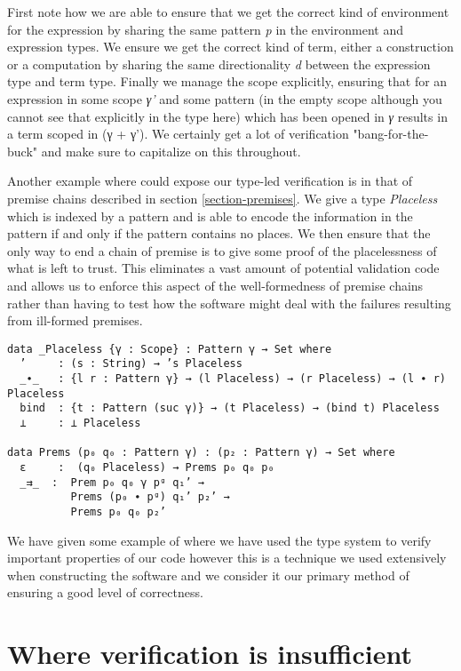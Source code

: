 First note how we are able to ensure that we get the correct kind of
environment for the expression by sharing the same pattern \emph{p} in
the environment and expression types. We ensure we get the correct
kind of term, either a construction or a computation by sharing the
same directionality \emph{d} between the expression type and term
type. Finally we manage the scope explicitly, ensuring that for an
expression in some scope \emph{γ'} and some pattern (in the empty
scope although you cannot see that explicitly in the type here) which
has been opened in \emph{γ} results in a term scoped in (γ + γ'). We
certainly get a lot of verification "bang-for-the-buck" and make sure
to capitalize on this throughout.

Another example where could expose our type-led verification is in
that of premise chains described in section \ref{section-premises}. We
give a type \emph{Placeless} which is indexed by a pattern and is able
to encode the information in the pattern if and only if the pattern
contains no places. We then ensure that the only way to end a chain of
premise is to give some proof of the placelessness of what is left to
trust. This eliminates a vast amount of potential validation code and
allows us to enforce this aspect of the well-formedness of premise
chains rather than having to test how the software might deal
with the failures resulting from ill-formed premises.

\begin{verbatim}
data _Placeless {γ : Scope} : Pattern γ → Set where
  ’     : (s : String) → ’s Placeless
  _∙_   : {l r : Pattern γ} → (l Placeless) → (r Placeless) → (l ∙ r) Placeless
  bind  : {t : Pattern (suc γ)} → (t Placeless) → (bind t) Placeless
  ⊥     : ⊥ Placeless

data Prems (p₀ q₀ : Pattern γ) : (p₂ : Pattern γ) → Set where
  ε     :  (q₀ Placeless) → Prems p₀ q₀ p₀
  _⇉_  :  Prem p₀ q₀ γ pᵍ q₁’ →
          Prems (p₀ ∙ pᵍ) q₁’ p₂’ →
          Prems p₀ q₀ p₂’
\end{verbatim}

We have given some example of where we have used the type system to
verify important properties of our code however this is a technique we
used extensively when constructing the software and we consider it our
primary method of ensuring a good level of correctness.

\section{Where verification is insufficient}


